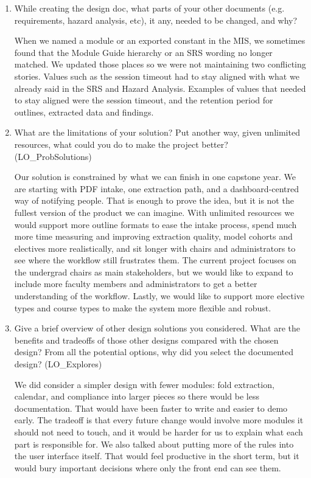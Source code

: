 \documentclass[12pt, titlepage]{article}
\begin{document}
\begin{enumerate}
  \item While creating the design doc, what parts of your other documents (e.g.
  requirements, hazard analysis, etc), it any, needed to be changed, and why?

When we named a module or an exported constant in the MIS, we sometimes found that the Module
Guide hierarchy or an SRS wording no longer matched. We updated those places so
we were not maintaining two conflicting stories. Values such as
the session timeout had to stay aligned with what we already said in the SRS
and Hazard Analysis. Examples of values that needed to stay aligned were the session timeout,
and the retention period for outlines, extracted data and findings.

  \item What are the limitations of your solution?  Put another way, given
    unlimited resources, what could you do to make the project better? (LO\_ProbSolutions)

Our solution is constrained by what we can finish in one capstone
year. We are starting with PDF intake, one extraction path, and a
dashboard-centred way of notifying people. That is enough to prove the idea,
but it is not the fullest version of the product we can imagine. With unlimited
resources we would support more outline formats to ease the intake process, spend much more time measuring
and improving extraction quality, model cohorts and electives more realistically,
and sit longer with chairs and administrators to see where the workflow still
frustrates them. The current project focuses on the undergrad chairs as main stakeholders, but we would like to expand to 
include more faculty members and administrators to get a better understanding of the workflow. 
Lastly, we would like to support more elective types and course types to make the system more flexible and robust.

  \item Give a brief overview of other design solutions you considered.  What
    are the benefits and tradeoffs of those other designs compared with the chosen
    design?  From all the potential options, why did you select the documented design?
    (LO\_Explores)

We did consider a simpler design with fewer modules: fold extraction, calendar,
and compliance into larger pieces so there would be less documentation.
That would have been faster to write and easier to demo early. The
tradeoff is that every future change would involve more modules it should not need to touch, and it would
be harder for us to explain what each part is responsible for. We also talked
about putting more of the rules into the user interface itself. That would feel
productive in the short term, but it would bury important decisions where only
the front end can see them.


\end{enumerate}
\end{document}
